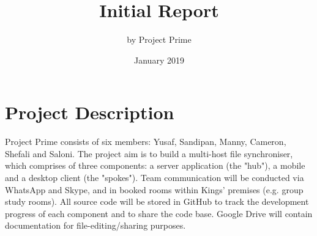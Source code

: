 \documentclass{article}
\title{Initial Report}
\author{by Project Prime}
\date{January 2019}
\begin{document}
\maketitle

\section{Project Description}
Project Prime consists of six members: Yusaf, Sandipan, Manny, Cameron, Shefali and Saloni. The project aim is to build a multi-host file synchroniser, which comprises of three components: a server application (the "hub"), a mobile and a desktop client (the "spokes"). Team communication will be conducted via WhatsApp and Skype, and in booked rooms within Kings' premises (e.g. group study rooms). All source code will be stored in GitHub to track the development progress of each component and to share the code base. Google Drive will contain documentation for file-editing/sharing purposes. 
\end{document}
